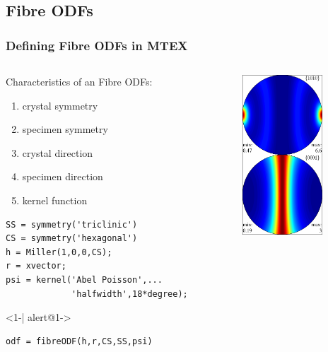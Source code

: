 \documentclass{beamer}
\newcommand{\MTEX}{{\bf {\color{red}M}TEX\,}}%
\begin{document}
\subsection*{Fibre ODFs}

\begin{frame}[fragile]
  \frametitle{Defining Fibre ODFs in \MTEX}

  \begin{columns}   
  
    \begin{column}{8.5cm}
    
      Characteristics of an Fibre ODFs:
      \begin{enumerate}
      \item crystal symmetry
      \item specimen symmetry
      \item crystal direction
      \item specimen direction
      \item kernel function
      \end{enumerate}
 

\begin{lstlisting}
SS = symmetry('triclinic')
CS = symmetry('hexagonal')
h = Miller(1,0,0,CS);
r = xvector;
psi = kernel('Abel Poisson',...
             'halfwidth',18*degree);
\end{lstlisting}

      \begin{actionenv}<1-| alert@1->
\begin{lstlisting}
odf = fibreODF(h,r,CS,SS,psi)
\end{lstlisting}
      \end{actionenv}

\end{column}
    
    \begin{column}{3cm}
      \includegraphics[width=3cm]{pic/fibreODF}
    \end{column}
  \end{columns}


\end{frame}
\end{document}
